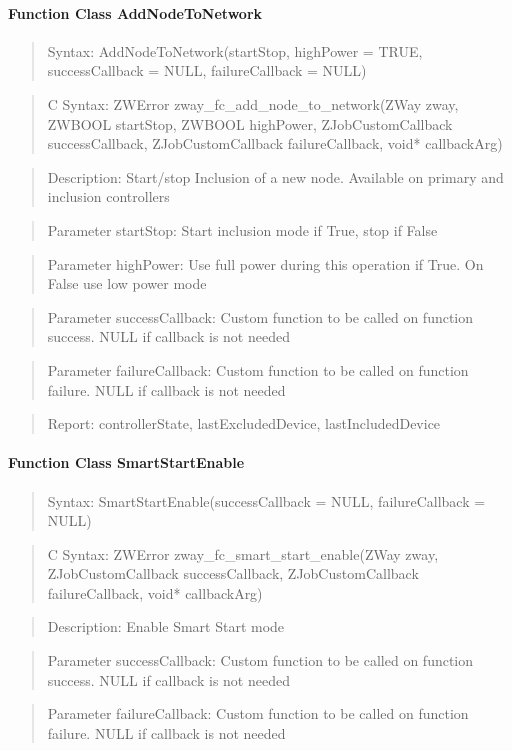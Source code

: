 \paragraph{Function Class AddNodeToNetwork}
\begin{quote}Syntax: AddNodeToNetwork(startStop, highPower = TRUE, successCallback = NULL, failureCallback = NULL)\end{quote}
\begin{quote}C Syntax: ZWError zway\_fc\_add\_node\_to\_network(ZWay zway, ZWBOOL startStop, ZWBOOL highPower, ZJobCustomCallback successCallback, ZJobCustomCallback failureCallback, void* callbackArg)\end{quote}
\begin{quote}Description: Start/stop Inclusion of a new node. Available on primary and inclusion controllers\end{quote}
\begin{quote}Parameter startStop: Start inclusion mode if True, stop if False\end{quote}
\begin{quote}Parameter highPower: Use full power during this operation if True. On False use low power mode\end{quote}
\begin{quote}Parameter successCallback: Custom function to be called on function success. NULL if callback is not needed\end{quote}
\begin{quote}Parameter failureCallback: Custom function to be called on function failure. NULL if callback is not needed\end{quote}
\begin{quote}Report: controllerState, lastExcludedDevice, lastIncludedDevice\end{quote}

\paragraph{Function Class SmartStartEnable}
\begin{quote}Syntax: SmartStartEnable(successCallback = NULL, failureCallback = NULL)\end{quote}
\begin{quote}C Syntax: ZWError zway\_fc\_smart\_start\_enable(ZWay zway, ZJobCustomCallback successCallback, ZJobCustomCallback failureCallback, void* callbackArg)\end{quote}
\begin{quote}Description: Enable Smart Start mode\end{quote}
\begin{quote}Parameter successCallback: Custom function to be called on function success. NULL if callback is not needed\end{quote}
\begin{quote}Parameter failureCallback: Custom function to be called on function failure. NULL if callback is not needed\end{quote}


